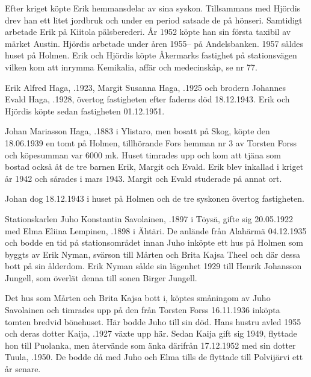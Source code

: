 Efter kriget köpte Erik hemmansdelar av sina syskon. Tillsammans med Hjördis drev han ett litet jordbruk och under en period satsade de på  hönseri. Samtidigt arbetade Erik på Kiitola pälsberederi. År 1952 köpte han sin första taxibil av märket Austin. Hjördis arbetade under åren 1955-- på Andelsbanken. 1957 såldes huset på Holmen. Erik och Hjördis köpte Åkermarks fastighet på stationsvägen vilken kom att inrymma Kemikalia, affär och medecinskåp, se nr 77.
\begin{jhchildren}
  \item {}
  \item {}
  \item {}
\end{jhchildren}


Erik Alfred Haga, .1923,  Margit Susanna Haga, .1925 och brodern Johannes Evald Haga, .1928, övertog fastigheten efter faderns död 18.12.1943. Erik och Hjördis köpte sedan fastigheten 01.12.1951.


Johan Mariasson Haga, .1883 i Ylistaro, men bosatt på Skog, köpte den 18.06.1939 en tomt på Holmen, tillhörande Fors hemman nr 3 av Torsten Forss och köpesumman var 6000 mk. Huset timrades upp och kom att tjäna som bostad också åt de tre barnen Erik, Margit och Evald. Erik blev inkallad i kriget år 1942 och sårades i mars 1943. Margit och Evald studerade på annat ort.

Johan dog 18.12.1943 i huset på Holmen och de tre syskonen övertog fastigheten.





Stationskarlen Juho Konstantin Savolainen, .1897 i Töysä, gifte sig 20.05.1922 med Elma Eliina Lempinen, .1898 i Ähtäri. De anlände från Alahärmä 04.12.1935 och bodde en tid på stationsområdet innan Juho inköpte ett hus på Holmen som byggts av Erik Nyman, svärson till Mårten och Brita Kajsa Theel och där dessa bott på sin ålderdom. Erik Nyman sålde sin lägenhet 1929 till Henrik Johansson Jungell, som överlät denna till sonen Birger Jungell.

Det hus som Mårten och Brita Kajsa bott i, köptes småningom av Juho Savolainen och timrades upp på den från Torsten Forss 16.11.1936 inköpta tomten bredvid bönehuset. Här bodde Juho till sin död. Hans hustru avled 1955 och deras dotter Kaija, .1927 växte upp här. Sedan Kaija gift sig 1949, flyttade hon till Puolanka, men återvände som änka därifrån 17.12.1952 med sin dotter Tuula, .1950. De bodde då med Juho och Elma tills de flyttade till Polvijärvi ett år senare.

